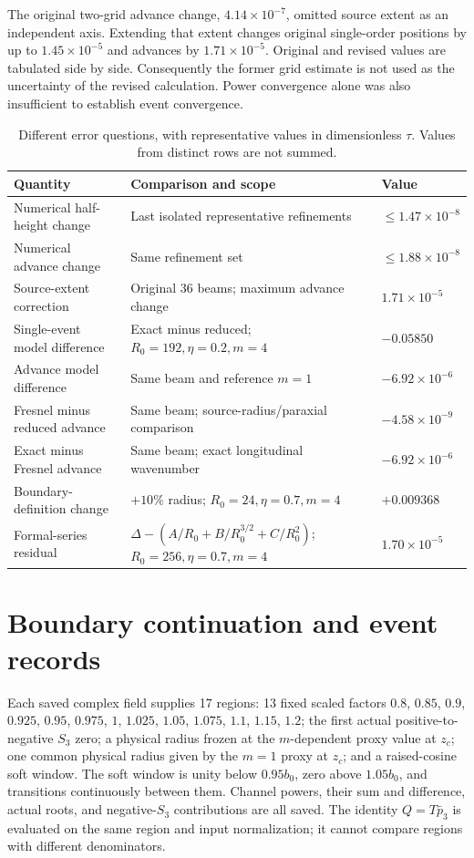 The original two-grid advance change, $4.14\times10^{-7}$, omitted source
extent as an independent axis. Extending that extent changes original
single-order positions by up to $1.45\times10^{-5}$ and advances by
$1.71\times10^{-5}$. Original and revised values are tabulated side by
side. Consequently the former grid estimate is not used as the uncertainty
of the revised calculation. Power convergence alone was also insufficient
to establish event convergence.

\begin{table}[t]
\centering\small
\caption{Different error questions, with representative values in
dimensionless $\tau$. Values from distinct rows are not summed.}
\begin{tabular}{p{.30\linewidth}p{.37\linewidth}p{.22\linewidth}}
\toprule
Quantity & Comparison and scope & Value \\
\midrule
Numerical half-height change & Last isolated representative refinements &
$\leq1.47\times10^{-8}$ \\
Numerical advance change & Same refinement set &
$\leq1.88\times10^{-8}$ \\
Source-extent correction & Original 36 beams; maximum advance change &
$1.71\times10^{-5}$ \\
Single-event model difference & Exact minus reduced; $R_0=192,\eta=0.2,m=4$ &
$-0.05850$ \\
Advance model difference & Same beam and reference $m=1$ &
$-6.92\times10^{-6}$ \\
Fresnel minus reduced advance & Same beam; source-radius/paraxial comparison &
$-4.58\times10^{-9}$ \\
Exact minus Fresnel advance & Same beam; exact longitudinal wavenumber &
$-6.92\times10^{-6}$ \\
Boundary-definition change & $+10\%$ radius; $R_0=24,\eta=0.7,m=4$ &
$+0.009368$ \\
Formal-series residual & $\Delta-(A/R_0+B/R_0^{3/2}+C/R_0^2)$;
$R_0=256,\eta=0.7,m=4$ & $1.70\times10^{-5}$ \\
\bottomrule
\end{tabular}
\end{table}

\section{Boundary continuation and event records}
\label{sec:si-root-events}
Each saved complex field supplies 17 regions: 13 fixed scaled factors
$0.8$, $0.85$, $0.9$, $0.925$, $0.95$, $0.975$, $1$, $1.025$,
$1.05$, $1.075$, $1.1$, $1.15$, $1.2$;
the first actual positive-to-negative $S_3$ zero; a physical radius frozen
at the $m$-dependent proxy value at $z_c$; one common physical radius
given by the $m=1$ proxy at $z_c$; and a raised-cosine soft window.
The soft window is unity below $0.95b_0$, zero above $1.05b_0$, and
transitions continuously between them. Channel powers, their sum and
difference, actual roots, and negative-$S_3$ contributions are all saved.
The identity $Q=T\bar p_3$ is evaluated on the same region and input
normalization; it cannot compare regions with different denominators.

